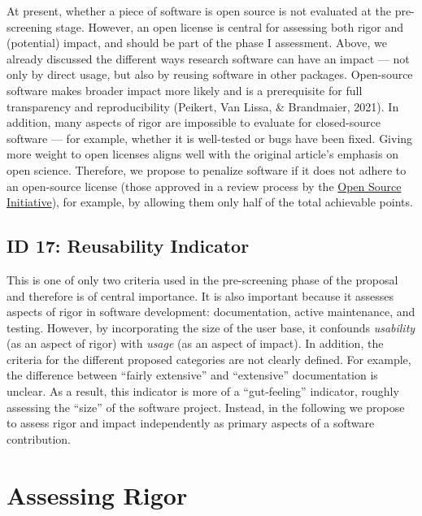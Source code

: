 \documentclass[
  man]{apa6}
\begin{document}
At present, whether a piece of software is open source is not evaluated at the pre-screening stage.
However, an open license is central for assessing both rigor and (potential) impact, and should be part of the phase I assessment.
Above, we already discussed the different ways research software can have an impact --- not only by direct usage, but also by reusing software in other packages.
Open-source software makes broader impact more likely and is a prerequisite for full transparency and reproducibility (Peikert, Van Lissa, \& Brandmaier, 2021).
In addition, many aspects of rigor are impossible to evaluate for closed-source software --- for example, whether it is well-tested or bugs have been fixed.
Giving more weight to open licenses aligns well with the original article's emphasis on open science.
Therefore, we propose to penalize software if it does not adhere to an open-source license (those approved in a review process by the \href{https://opensource.org/licenses}{Open Source Initiative}), for example, by allowing them only half of the total achievable points.

\hypertarget{id-17-reusability-indicator}{%
\subsection{ID 17: Reusability Indicator}\label{id-17-reusability-indicator}}

This is one of only two criteria used in the pre-screening phase of the proposal and therefore is of central importance.
It is also important because it assesses aspects of rigor in software development: documentation, active maintenance, and testing.
However, by incorporating the size of the user base, it confounds \emph{usability} (as an aspect of rigor) with \emph{usage} (as an aspect of impact).
In addition, the criteria for the different proposed categories are not clearly defined.
For example, the difference between ``fairly extensive'' and ``extensive'' documentation is unclear.
As a result, this indicator is more of a ``gut-feeling'' indicator, roughly assessing the ``size'' of the software project.
Instead, in the following we propose to assess rigor and impact independently as primary aspects of a software contribution.

\hypertarget{assessing-rigor}{%
\section{Assessing Rigor}\label{assessing-rigor}}
\end{document}
